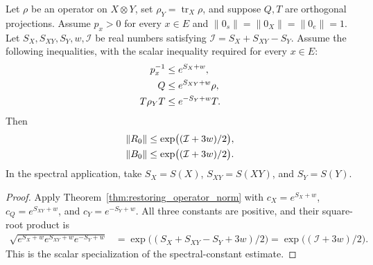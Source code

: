 \begin{theorem}
    \label{thm:restoring_norm_exp}
    \leanok
    Let $\rho$ be an operator on $X\otimes Y$, set
    $\rho_Y=\operatorname{tr}_X\rho$, and suppose $Q,T$ are
    orthogonal projections. Assume $p_x>0$ for every $x\in E$ and
    $\|0_s\|=\|0_X\|=\|0_e\|=1$.
    Let $S_X,S_{XY},S_Y,w,\mathcal I$ be real numbers satisfying
    $\mathcal I=S_X+S_{XY}-S_Y$. Assume the following inequalities,
    with the scalar inequality required for every $x\in E$:
    \begin{align}
        p_x^{-1}&\le e^{S_X+w},\label{eq:restoring_exp_hypotheses}\\
        Q&\le e^{S_{XY}+w}\rho,\notag\\
        T\rho_YT&\le e^{-S_Y+w}T.\notag
    \end{align}
    Then
    \begin{align}
        \|R_0\|&\le\exp\bigl((\mathcal I+3w)/2\bigr),
        \label{eq:restoring_norm_exp}\\
        \|B_0\|&\le\exp\bigl((\mathcal I+3w)/2\bigr).\notag
    \end{align}
    In the spectral application, take
    $S_X=S(X)$, $S_{XY}=S(XY)$, and $S_Y=S(Y)$.
\end{theorem}
\begin{proof}\leanok
    Apply Theorem~\ref{thm:restoring_operator_norm} with
    $c_X=e^{S_X+w}$, $c_Q=e^{S_{XY}+w}$, and $c_Y=e^{-S_Y+w}$.
    All three constants are positive, and their square-root product is
    \begin{align*}
        \sqrt{e^{S_X+w}e^{S_{XY}+w}e^{-S_Y+w}}
        &=\exp\bigl((S_X+S_{XY}-S_Y+3w)/2\bigr)
        =\exp\bigl((\mathcal I+3w)/2\bigr).
    \end{align*}
    This is the scalar specialization of the spectral-constant estimate.
\end{proof}

